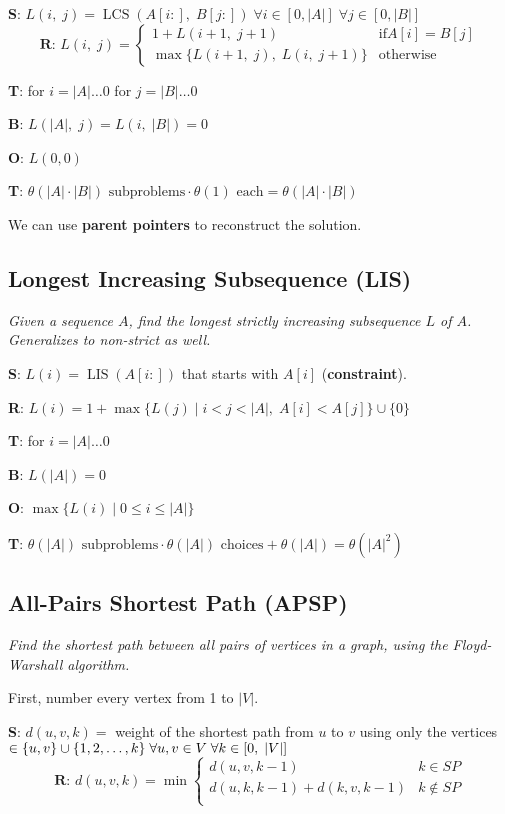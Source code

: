 \textbf{S}: $L(i, \; j) = \operatorname{LCS}(A[i:], \; B[j:]) \; \forall i \in [0, |A|] \; \forall j \in [0, |B|]$\\[-0.2em]
\[ \textbf{R}\text{: } L(i, \; j) = \begin{cases} 
    1 + L(i + 1, \; j + 1) & \text{if} A[i] = B[j] \\
    \max\{L(i + 1, \; j), \; L(i, \; j + 1)\} & \text{otherwise}
 \end{cases}
\]

\textbf{T}: for $i = |A| \dots 0$ for $j = |B| \dots 0$

\textbf{B}: $L(|A|, \; j) = L(i, \; |B|) = 0$

\textbf{O}: $L(0, 0)$

\textbf{T}: $\theta(|A| \cdot |B|) \text{ subproblems} \cdot \theta(1) \text{ each} = \theta(|A| \cdot |B|)$

We can use \textbf{parent pointers} to reconstruct the solution.

\subsection{Longest Increasing Subsequence (LIS)}
\emph{Given a sequence $A$, find the longest strictly increasing subsequence $L$ of $A$. Generalizes to non-strict as well.}

\textbf{S}: $L(i) = \operatorname{LIS}(A[i:])$ that starts with $A[i]$ (\textbf{constraint}).

\textbf{R}: $L(i) = 1 + \max \{ L(j) \; | \; i < j < |A|, \; A[i] < A[j] \} \cup \{ 0 \}$

\textbf{T}: for $i = |A| \dots 0$

\textbf{B}: $L(|A|) = 0$

\textbf{O}: $\max \{ L(i) \; | \; 0 \leq i \leq |A| \}$

\textbf{T}: $\theta(|A|) \text{ subproblems} \cdot \theta(|A|) \text{ choices} + \theta(|A|) = \theta(|A|^2)$

\subsection{All-Pairs Shortest Path (APSP)}
\emph{Find the shortest path between all pairs of vertices in a graph, using the Floyd-Warshall algorithm.}

First, number every vertex from 1 to $|V|$.

\textbf{S}: $d(u, v, k) =$ weight of the shortest path from $u$ to $v$ using only the vertices $\in \{ u, v \} \cup \{ 1, 2, \dots, k \} \linebreak \;
\forall u, v \in V \; \forall k \in [0, \; |V|]$\\[-0.2em]
\[ \textbf{R}\text{: } d(u, v, k) = \min \begin{cases} 
    d(u, v, k - 1) & k \in SP \\
    d(u, k, k - 1) + d(k, v, k - 1) & k \notin SP \\
 \end{cases}
\]

